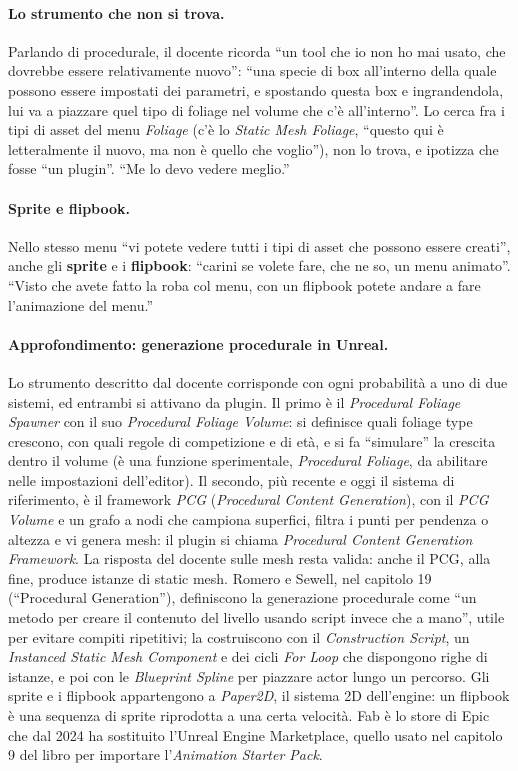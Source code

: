 \paragraph{Lo strumento che non si trova.} Parlando di procedurale, il docente ricorda ``un
tool che io non ho mai usato, che dovrebbe essere relativamente nuovo'': ``una specie di box
all'interno della quale possono essere impostati dei parametri, e spostando questa box e
ingrandendola, lui va a piazzare quel tipo di foliage nel volume che c'è all'interno''. Lo
cerca fra i tipi di asset del menu \emph{Foliage} (c'è lo \emph{Static Mesh Foliage}, ``questo
qui è letteralmente il nuovo, ma non è quello che voglio''), non lo trova, e ipotizza che
fosse ``un plugin''. ``Me lo devo vedere meglio.''

\paragraph{Sprite e flipbook.} Nello stesso menu ``vi potete vedere tutti i tipi di asset che
possono essere creati'', anche gli \textbf{sprite} e i \textbf{flipbook}: ``carini se volete
fare, che ne so, un menu animato''. ``Visto che avete fatto la roba col menu, con un flipbook
potete andare a fare l'animazione del menu.''

\paragraph{Approfondimento: generazione procedurale in Unreal.} Lo strumento descritto dal
docente corrisponde con ogni probabilità a uno di due sistemi, ed entrambi si attivano da
plugin. Il primo è il \emph{Procedural Foliage Spawner} con il suo \emph{Procedural Foliage
Volume}: si definisce quali foliage type crescono, con quali regole di competizione e di
età, e si fa ``simulare'' la crescita dentro il volume (è una funzione sperimentale,
\emph{Procedural Foliage}, da abilitare nelle impostazioni dell'editor). Il secondo, più
recente e oggi il sistema di riferimento, è il framework \emph{PCG} (\emph{Procedural
Content Generation}), con il \emph{PCG Volume} e un grafo a nodi che campiona superfici,
filtra i punti per pendenza o altezza e vi genera mesh: il plugin si chiama
\emph{Procedural Content Generation Framework}. La risposta del docente sulle mesh resta
valida: anche il PCG, alla fine, produce istanze di static mesh. Romero e Sewell, nel
capitolo 19 (``Procedural Generation''), definiscono la generazione procedurale come ``un
metodo per creare il contenuto del livello usando script invece che a mano'', utile per
evitare compiti ripetitivi; la costruiscono con il \emph{Construction Script}, un
\emph{Instanced Static Mesh Component} e dei cicli \emph{For Loop} che dispongono righe di
istanze, e poi con le \emph{Blueprint Spline} per piazzare actor lungo un percorso. Gli
sprite e i flipbook appartengono a \emph{Paper2D}, il sistema 2D dell'engine: un flipbook è
una sequenza di sprite riprodotta a una certa velocità. Fab è lo store di Epic che dal 2024
ha sostituito l'Unreal Engine Marketplace, quello usato nel capitolo 9 del libro per
importare l'\emph{Animation Starter Pack}.

